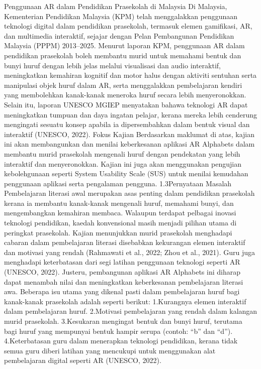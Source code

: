 Penggunaan AR dalam Pendidikan Prasekolah di Malaysia
Di Malaysia, Kementerian Pendidikan Malaysia (KPM) telah menggalakkan penggunaan teknologi digital dalam pendidikan prasekolah, termasuk elemen gamifikasi, AR, dan multimedia interaktif, sejajar dengan Pelan Pembangunan Pendidikan Malaysia (PPPM) 2013–2025.
Menurut laporan KPM, penggunaan AR dalam pendidikan prasekolah boleh membantu murid untuk memahami bentuk dan bunyi huruf dengan lebih jelas melalui visualisasi dan audio interaktif, meningkatkan kemahiran kognitif dan motor halus dengan aktiviti sentuhan serta manipulasi objek huruf dalam AR, serta menggalakkan pembelajaran kendiri yang membolehkan kanak-kanak meneroka huruf secara lebih menyeronokkan.
Selain itu, laporan UNESCO MGIEP menyatakan bahawa teknologi AR dapat meningkatkan tumpuan dan daya ingatan pelajar, kerana mereka lebih cenderung mengingati sesuatu konsep apabila ia dipersembahkan dalam bentuk visual dan interaktif (UNESCO, 2022).
Fokus Kajian
Berdasarkan maklumat di atas, kajian ini akan membangunkan dan menilai keberkesanan aplikasi AR Alphabets dalam membantu murid prasekolah mengenali huruf dengan pendekatan yang lebih interaktif dan menyeronokkan.
Kajian ini juga akan menggunakan pengujian kebolehgunaan seperti System Usability Scale (SUS) untuk menilai kemudahan penggunaan aplikasi serta pengalaman pengguna.
1.3Pernyataan Masalah
Pembelajaran literasi awal merupakan asas penting dalam pendidikan prasekolah kerana ia membantu kanak-kanak mengenali huruf, memahami bunyi, dan mengembangkan kemahiran membaca. Walaupun terdapat pelbagai inovasi teknologi pendidikan, kaedah konvensional masih menjadi pilihan utama di peringkat prasekolah. Kajian menunjukkan murid prasekolah menghadapi cabaran dalam pembelajaran literasi disebabkan kekurangan elemen interaktif dan motivasi yang rendah (Rahmawati et al., 2022; Zhou et al., 2021).
Guru juga menghadapi keterbatasan dari segi latihan penggunaan teknologi seperti AR (UNESCO, 2022). Justeru, pembangunan aplikasi AR Alphabets ini diharap dapat menambah nilai dan meningkatkan keberkesanan pembelajaran literasi awa.
Beberapa isu utama yang dikenal pasti dalam pembelajaran huruf bagi kanak-kanak prasekolah adalah seperti berikut:
1.Kurangnya elemen interaktif dalam pembelajaran huruf.
2.Motivasi pembelajaran yang rendah dalam kalangan murid prasekolah.
3.Kesukaran mengingat bentuk dan bunyi huruf, terutama bagi huruf yang mempunyai bentuk hampir serupa (contoh: “b” dan “d”).
4.Keterbatasan guru dalam menerapkan teknologi pendidikan, kerana tidak semua guru diberi latihan yang mencukupi untuk menggunakan alat pembelajaran digital seperti AR (UNESCO, 2022).
